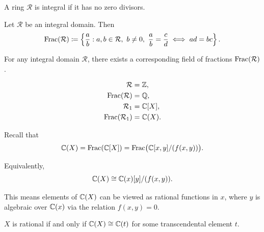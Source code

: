
\begin{definition}
    A ring $$ is integral if it has no zero divisors.
\end{definition}

\begin{definition}
    Let $$ be an integral domain.
    Then
    \[
        \Frac(\mathcal{R}) \coloneqq \left\{ \frac{a}{b} : a,b\in\mathcal{R},\ b\neq 0,\ \frac{a}{b} = \frac{c}{d} \iff ad = bc \right\}.
    \]
\end{definition}

\begin{lemma*}{
    For any integral domain $\mathcal{R}$, there exists a corresponding field of fractions $\mathrm{Frac}(\mathcal{R})$.
}
\end{lemma*}

\begin{align*}
    \mathcal{R} &= \mathbb{Z},\\
    \mathrm{Frac}(\mathcal{R}) &= \mathbb{Q},\\
    \mathcal{R}_1 &= \mathbb{C}[X],\\
    \mathrm{Frac}(\mathcal{R}_1) &= \mathbb{C}(X).
\end{align*}

Recall that
\[
    \mathbb{C}(X) = \mathrm{Frac}(\mathbb{C}[X]) = \mathrm{Frac}\big(\mathbb{C}[x,y]/(f(x,y))\big).
\]

Equivalently,
\[
    \mathbb{C}(X) \cong \mathbb{C}(x)[y]/(f(x,y)).
\]

This means elements of $\mathbb{C}(X)$ can be viewed as rational functions in $x$, where $y$ is algebraic over $\mathbb{C}(x)$ via the relation $f(x,y)=0$.

\begin{theorem*}{
    $X$ is rational if and only if $\mathbb{C}(X)\cong \mathbb{C}(t)$ for some transcendental element $t$.
}
\end{theorem*}

